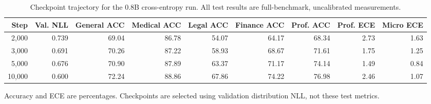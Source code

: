 \begin{table}[t]
\centering
\footnotesize
\setlength{\tabcolsep}{4pt}
\caption{Checkpoint trajectory for the 0.8B cross-entropy run. All test results are full-benchmark, uncalibrated measurements.}
\label{tab:trajectory}
\begin{tabular}{rrrrrrrrr}
\toprule
Step & Val. NLL & General ACC & Medical ACC & Legal ACC & Finance ACC & Prof. ACC & Prof. ECE & Micro ECE \\
\midrule
2,000 & 0.739 & 69.04 & 86.78 & 54.07 & 64.17 & 68.34 & 2.73 & 1.63 \\
3,000 & 0.691 & 70.26 & 87.22 & 58.93 & 68.67 & 71.61 & 1.75 & 1.25 \\
5,000 & 0.676 & 70.90 & 87.89 & 63.37 & 71.17 & 74.14 & 1.49 & 0.84 \\
10,000 & 0.600 & 72.24 & 88.86 & 67.86 & 74.22 & 76.98 & 2.46 & 1.07 \\
\bottomrule
\end{tabular}
\par\vspace{3pt}\begin{minipage}{\textwidth}\footnotesize Accuracy and ECE are percentages. Checkpoints are selected using validation distribution NLL, not these test metrics.\end{minipage}
\end{table}
